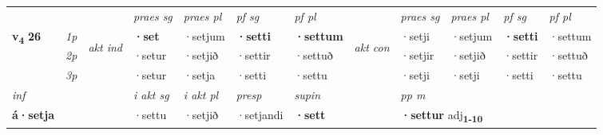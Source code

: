 \begin{longtable}[l]{X>{\footnotesize\itshape}llXXXXlXXXX}
 & &   & \textit{praes sg}  & \textit{praes pl}    & \textit{ pf sg} & \textit{pf pl} & & \textit{praes sg}  & \textit{praes pl}    & \textit{pf sg} & \textit{pf pl }  \\ \cmidrule{4-7} \cmidrule{9-12}
 \multirow{2}{*}{{{\textbf{v{\textsubscript{4}}} \Large{\textbf{26}}}}}  & 1p & \multirow{3}{*}{\begin{turn}{90}\textit{akt ind}\end{turn}} & \textbf{·set} & ·setjum & \textbf{·setti} & \textbf{·settum} & \multirow{3}{*}{\begin{turn}{90}\textit{akt con}\end{turn}} &·setji & ·setjum & \textbf{·setti} & ·settum\\*
 & 2p &  &  ·setur  & ·setjið & ·settir & ·settuð & & ·setjir & ·setjið & ·settir & ·settuð \\*
 & 3p &  & ·setur & ·setja & ·setti & ·settu & & ·setji & ·setji& ·setti & ·settu \\*
\cmidrule{4-7} \cmidrule{9-12}

   {\textit{inf}} & &  & \textit{i akt sg} & \textit{i akt pl}   & \textit{presp} & \textit{supin}  && \textit{pp m} \\*
  {\textbf{á\allowbreak ·setja}} & && ·settu  & ·setjið   & ·setjandi &  \textbf{·sett}  && \multicolumn{2}{l}{\textbf{·settur} adj\textbf{\textsubscript{1-10}}} \\*

\midrule


\end{longtable}
